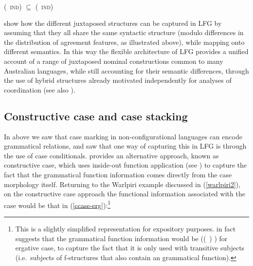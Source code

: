 \documentclass[output=paper,hidelinks]{langscibook}
\begin{document}
\ea \label{schema3} 
\z

\ea \label{appos-ps}
 { (\DOWN\ \textsc{ind}) $\subseteq$ (\UP\ \textsc{ind})\\
}
\z


\citet{SadlNord2010} show how the different juxtaposed structures can be captured in LFG by assuming that they all share the same syntactic structure (modulo differences in the distribution of agreement features, as illustrated above), while mapping onto different semantics. In this way the flexible architecture of LFG provides a unified account of a range of juxtaposed nominal constructions common to many Australian languages, while still accounting for their semantic differences, through the use of hybrid structures already motivated independently for analyses of coordination \citep{DalrympleKaplan2000} (see also ).

\subsection{Constructive case and case stacking}
\label{sec:const-case}

In  above we saw that case marking in non-configurational languages can encode grammatical relations, and saw that one way of capturing this in LFG is through the use of case conditionals. \citet{nordlinger1998constructive} provides an alternative approach, known as constructive case, which uses inside-out function application (see ) to capture the fact that the grammatical function information comes directly from the case morphology itself. Returning to the Warlpiri example discussed in (\ref{warlpiri2}), on the constructive case approach the functional information associated with the \ERG case would be that in (\ref{ccase-erg}):\footnote{This is a slightly simplified representation for expository purposes. \citet[73]{nordlinger1998constructive} in fact suggests that the grammatical function information would be ((\SUBJ\ \UP) \OBJ) for ergative case, to capture the fact that it is only used with transitive subjects (i.e.\ subjects of f-structures that also contain an \OBJ grammatical function).} 
\end{document}
